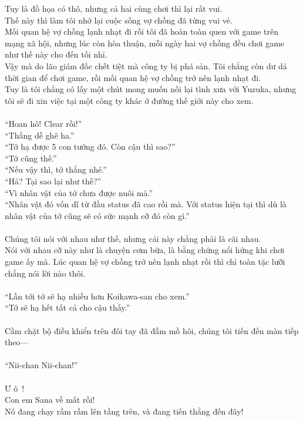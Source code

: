 \documentclass[12pt,a4paper, twosides]{book}
\begin{document}
Tuy là đồ họa có thô, nhưng cả hai cùng chơi thì lại rất vui.\\
Thế này thì làm tôi nhớ lại cuộc sống vợ chồng đã từng vui vẻ.\\
Mối quan hệ vợ chồng lạnh nhạt đi rồi tôi đã hoàn toàn quen với game trên mạng xã hội, nhưng lúc còn hòa thuận, mỗi ngày hai vợ chồng đều chơi game như thế này cho đến tối nhỉ.\\
Vậy mà do lão giám đốc chết tiệt mà công ty bị phá sản. Tôi chẳng còn dư dả thời gian để chơi game, rồi mối quan hệ vợ chồng trở nên lạnh nhạt đi.\\
Tuy là tôi chẳng có lấy một chút mong muốn nối lại tình xưa với Yuzuka, nhưng tôi sẽ đi xin việc tại một công ty khác ở đường thế giới này cho xem.\\
\\
“Hoan hô! Clear rồi!”\\
“Thắng dễ ghê ha.”\\
“Tớ hạ được 5 con tướng đó. Còn cậu thì sao?”\\
“Tớ cũng thế.”\\
“Nếu vậy thì, tớ thắng nhé.”\\
“Hả? Tại sao lại như thế?”\\
“Vì nhân vật của tớ chưa được nuôi mà.”\\
“Nhân vật đó vốn dĩ từ đầu status đã cao rồi mà. Với status hiện tại thì dù là nhân vật của tớ cũng sẽ có sức mạnh cỡ đó còn gì.”\\
\\
Chúng tôi nói với nhau như thế, nhưng cái này chẳng phải là cãi nhau.\\
Nói với nhau cỡ này như là chuyện cơm bữa, là bằng chứng nổi hứng khi chơi game ấy mà. Lúc quan hệ vợ chồng trở nên lạnh nhạt rồi thì chỉ toàn tặc lưỡi chẳng nói lời nào thôi.\\
\\
“Lần tới tớ sẽ hạ nhiều hơn Koikawa-san cho xem.”\\
“Tớ sẽ hạ hết tất cả cho cậu thấy.”\\
\\
Cầm chặt bộ điều khiển trên đôi tay đã đẫm mồ hôi, chúng tôi tiến đến màn tiếp theo—\\
\\
“Nii-chan Nii-chan!”\\
\\
Ư ô~!\\
Con em Sana về mất rồi!\\
Nó đang chạy rầm rầm lên tầng trên, và đang tiến thẳng đến đây!\\
\end{document}
